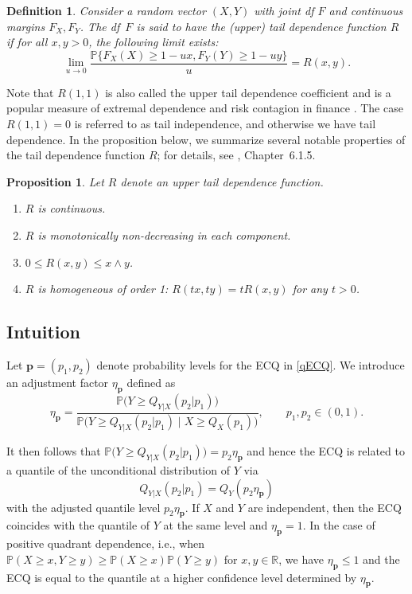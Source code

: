 \documentclass[11pt,letterpaper]{article}
\def\bql{\begin{equation}\label}
\def\eql{\end{equation}\noindent}
\def\bpr{\begin{proposition}}
\def\epr{\end{proposition}}
\def\bdf{\begin{definition}}
\def\edf{\end{definition}}
\def\h{\eta}
\def\pb{{\mathbf p}}
\def\pbb{{\mathbb P}}
\def\rbb{{\mathbb R}}
\newtheorem{proposition}[theorem]{Proposition}
\newtheorem{definition}{Definition}
\numberwithin{equation}{section}
\begin{document}
\bdf Consider a random vector $(X,Y)$ with joint df $F$ and continuous margins $F_X,F_Y$. The df~$F$ is said to have the \emph{(upper) tail dependence function} $R$ if for all $x,y>0$, the following limit exists:
\bql{qTDF} \lim_{u\to 0}\frac{\pbb\bigl\{F_X(X)\geq 1-ux, F_Y(Y)\geq 1-uy\bigr\}}{u} =  R(x,y).\eql
\edf


Note that $R(1,1)$ is also called the upper tail dependence coefficient \citep{Joe1997} and is a popular measure of extremal dependence and risk contagion in finance \citep{QRM}. The case $R(1,1)=0$ is referred to as tail independence, and otherwise we have tail dependence. In the proposition below, we summarize several notable properties of the tail dependence function $R$; for details, see \cite{dHF2006}, Chapter~6.1.5. 
\bpr\label{pTDF} Let $R$ denote an upper tail dependence function.
\begin{enumerate}[label=\arabic*)] 
\item $R$ is continuous.
\item $R$ is monotonically non-decreasing in each component.
\item $0\leq R(x,y)\leq x\wedge y$.
\item $R$ is homogeneous of order 1: $R(tx,ty) = tR(x,y)$ for any $t>0$.
\end{enumerate}
\epr

\subsection{Intuition}\label{sm1}

Let $\pb=(p_1,p_2)$ denote probability levels for the ECQ in \eqref{qECQ}. We introduce an adjustment factor $\h_\pb$ defined as
\bql{qeta}
\h_\pb=\dfrac{\pbb\bigl(Y\ge Q_{Y|X}(p_2|p_1) \bigr)}{\pbb\bigl(Y\ge Q_{Y|X}(p_2|p_1) \mid X\ge Q_X(p_1)\bigr)},\qquad p_1,p_2\in(0,1).
\eql


It then follows that $\pbb\bigl(Y\ge Q_{Y|X}(p_2|p_1) \bigr)= p_2\h_\pb$ and hence the ECQ is related to a quantile of the unconditional distribution of $Y$ via
\bql{qeta2}
Q_{Y|X}(p_2|p_1) = Q_Y( p_2 \h_\pb)
\eql
with the adjusted quantile level $p_2 \h_\pb$. If $X$ and $Y$ are independent, then the ECQ coincides with the quantile of $Y$ at the same level and $\h_\pb=1$. In the case of positive quadrant dependence, i.e., when $\pbb(X\ge x,Y\ge y)\ge \pbb(X\ge x)\pbb(Y\ge y)$ for $x,y\in\rbb$, we have $\h_\pb\le 1$ and the ECQ is equal to the quantile at a higher confidence level determined by $\h_\pb$.
\end{document}

